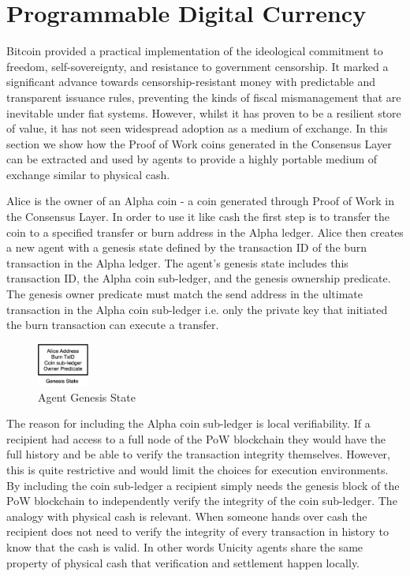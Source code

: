 \documentclass{article}
\begin{document}
\section{Programmable Digital Currency}

Bitcoin provided a practical implementation of the ideological commitment to freedom, self-sovereignty, and resistance to government censorship.  It marked a significant advance towards censorship-resistant money with predictable and transparent issuance rules, preventing the kinds of fiscal mismanagement that are inevitable under fiat systems. However, whilst it has proven to be a resilient store of value, it has not seen widespread adoption as a medium of exchange. In this section we show how the Proof of Work coins generated in the Consensus Layer can be extracted and used by agents to provide a highly portable medium of exchange similar to physical cash.

Alice is the owner of an Alpha coin - a coin generated through Proof of Work in the Consensus Layer. In order to use it like cash the first step is to transfer the coin to a specified transfer or burn address in the Alpha ledger. Alice then creates a new agent with a genesis state defined by the transaction ID of the burn transaction in the Alpha ledger. The agent's genesis state includes this transaction ID, the Alpha coin sub-ledger, and the genesis ownership predicate. The genesis owner predicate must match the send address in the ultimate transaction in the Alpha coin sub-ledger i.e. only the private key that initiated the burn transaction can execute a transfer.

\begin{figure}[htbp]
    \centering
    \includegraphics[width=0.15\textwidth]{CoinGenesis.png}
    \caption{Agent Genesis State}
    \label{fig:GenesisEvent}
\end{figure}

The reason for including the Alpha coin sub-ledger is local verifiability. If a recipient had access to a full node of the PoW blockchain they would have the full history and be able to verify the transaction integrity themselves. However, this is quite restrictive and would limit the choices for execution environments. By including the coin sub-ledger a recipient simply needs the genesis block of the PoW blockchain to independently verify the integrity of the coin sub-ledger. The analogy with physical cash is relevant. When someone hands over cash the recipient does not need to verify the integrity of every transaction in history to know that the cash is valid. In other words Unicity agents share the same property of physical cash that verification and settlement happen locally.
\end{document}
